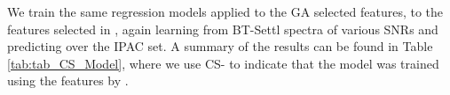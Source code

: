 
We train the same regression models applied to the GA selected
features, to the features selected in \cite{cesetti}, again learning
from BT-Settl spectra of various SNRs and predicting over the IPAC
set. A summary of the results can be found in Table
\ref{tab:tab_CS_Model}, where we use CS- to indicate that the model was
trained using the features by \cite{cesetti}.

